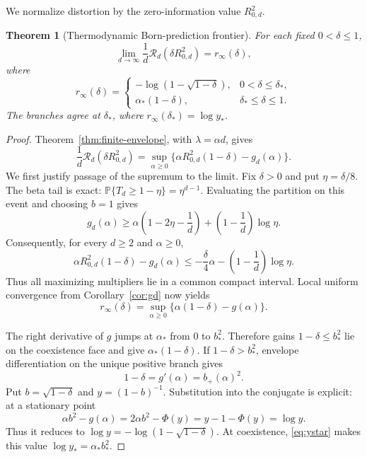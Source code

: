 \documentclass[11pt,a4paper]{article}
\newtheorem{theorem}{Theorem}[section]
\theoremstyle{remark}
\newcommand{\Pp}{\mathbb{P}}
\newcommand{\cR}{\mathcal{R}}
\begin{document}
We normalize distortion by the zero-information value $R_{0,d}^2$.

\begin{theorem}[Thermodynamic Born-prediction frontier]
\label{thm:thermodynamic-rdf}
For each fixed $0<\delta\le1$,
\begin{equation}
 \lim_{d\to\infty}\frac1d
 \cR_d(\delta R_{0,d}^2)=r_\infty(\delta),
 \label{eq:rdf-limit}
\end{equation}
where
\begin{equation}
 r_\infty(\delta)=
 \begin{cases}
 -\log(1-\sqrt{1-\delta}),
   &0<\delta\le\delta_*,\\[1mm]
 \alpha_*(1-\delta),
   &\delta_*\le\delta\le1.
 \end{cases}
 \label{eq:rinfty}
\end{equation}
The branches agree at $\delta_*$, where
$r_\infty(\delta_*)=\log y_*$.
\end{theorem}

\begin{proof}
Theorem~\ref{thm:finite-envelope}, with $\lambda=\alpha d$, gives
\begin{equation}
 \frac1d\cR_d(\delta R_{0,d}^2)
 =\sup_{\alpha\ge0}
 \{\alpha R_{0,d}^2(1-\delta)-g_d(\alpha)\}.
 \label{eq:scaled-dual}
\end{equation}
We first justify passage of the supremum to the limit.  Fix $\delta>0$ and
put $\eta=\delta/8$.  The beta tail is exact:
$\Pp\{T_d\ge1-\eta\}=\eta^{d-1}$.  Evaluating the partition on this event
and choosing $b=1$ gives
\begin{equation}
 g_d(\alpha)\ge
 \alpha\left(1-2\eta-\frac1d\right)
 +\left(1-\frac1d\right)\log\eta.
\end{equation}
Consequently, for every $d\ge2$ and $\alpha\ge0$,
\begin{equation}
 \alpha R_{0,d}^2(1-\delta)-g_d(\alpha)
 \le -\frac{\delta}{4}\alpha
 -\left(1-\frac1d\right)\log\eta.
 \label{eq:equicoercive}
\end{equation}
Thus all maximizing multipliers lie in a common compact interval.  Local
uniform convergence from Corollary~\ref{cor:gd} now yields
\begin{equation}
 r_\infty(\delta)=\sup_{\alpha\ge0}
 \{\alpha(1-\delta)-g(\alpha)\}.
 \label{eq:limit-conjugate}
\end{equation}

The right derivative of $g$ jumps at $\alpha_*$ from $0$ to $b_*^2$.
Therefore gains $1-\delta\le b_*^2$ lie on the coexistence face and give
$\alpha_*(1-\delta)$.  If $1-\delta>b_*^2$, envelope differentiation on the
unique positive branch gives
\begin{equation}
 1-\delta=g'(\alpha)=b_+(\alpha)^2.
\end{equation}
Put $b=\sqrt{1-\delta}$ and $y=(1-b)^{-1}$.  Substitution into the conjugate
is explicit: at a stationary point
\begin{equation}
 \alpha b^2-g(\alpha)=2\alpha b^2-\Phi(y)
 =y-1-\Phi(y)=\log y.
\end{equation}
Thus it reduces to $\log y=-\log(1-\sqrt{1-\delta})$.  At coexistence,
\eqref{eq:ystar} makes this value $\log y_*=\alpha_*b_*^2$.
\end{proof}
\end{document}
